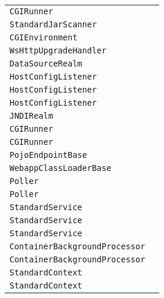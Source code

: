 \begin{center}
\begin{tabular}{ll}
\lstinline/CGIRunner/&\raisebox{0pt}{\lstinline/ sendToLog(BufferedReaderrdr)/}\\ 
\lstinline/StandardJarScanner/&\raisebox{0pt}{\lstinline/ scan()/}\\ 
\lstinline/CGIEnvironment/&\raisebox{0pt}{\lstinline/ expandCGIScript()/}\\ 
\lstinline/WsHttpUpgradeHandler/&\raisebox{0pt}{\lstinline/ destroy()/}\\ 
\lstinline/DataSourceRealm/&\raisebox{0pt}{\lstinline/ getRoles(Connection,String)/}\\ 
\lstinline/HostConfigListener/&\raisebox{0pt}{\lstinline/ checkUndeploy()/}\\ 
\lstinline/HostConfigListener/&\raisebox{0pt}{\lstinline/ checkUndeploy()/}\\ 
\lstinline/HostConfigListener/&\raisebox{0pt}{\lstinline/ checkUndeploy()/}\\ 
\lstinline/JNDIRealm/&\raisebox{0pt}{\lstinline/ startInternal())/}\\ 
\lstinline/CGIRunner/&\raisebox{0pt}{\lstinline/ sendToLog(BufferedReaderrdr)/}\\ 
\lstinline/CGIRunner/&\raisebox{0pt}{\lstinline/ sendToLog(BufferedReaderrdr)/}\\ 
\lstinline/PojoEndpointBase/&\raisebox{0pt}{\lstinline/ onError(Session,Throwable)/}\\ 
\lstinline/WebappClassLoaderBase/&\raisebox{0pt}{\lstinline/ findClassInternal(String)/}\\ 
\lstinline/Poller/&\raisebox{0pt}{\lstinline/ timeout(intkeyCount,booleanhasEvents)/}\\ 
\lstinline/Poller/&\raisebox{0pt}{\lstinline/ timeout(intkeyCount,booleanhasEvents)/}\\ 
\lstinline/StandardService/&\raisebox{0pt}{\lstinline/ stopInternal())/}\\ 
\lstinline/StandardService/&\raisebox{0pt}{\lstinline/ stopInternal())/}\\ 
\lstinline/StandardService/&\raisebox{0pt}{\lstinline/ stopInternal())/}\\ 
\lstinline/ContainerBackgroundProcessor/&\raisebox{0pt}{\lstinline/ processChildren(Container)/}\\ 
\lstinline/ContainerBackgroundProcessor/&\raisebox{0pt}{\lstinline/ processChildren(Container)/}\\ 
\lstinline/StandardContext/&\raisebox{0pt}{\lstinline/ checkUnusualURLPattern(String)/}\\ 
\lstinline/StandardContext/&\raisebox{0pt}{\lstinline/ checkUnusualURLPattern(String)/}\\ 

\end{tabular}
\end{center}
